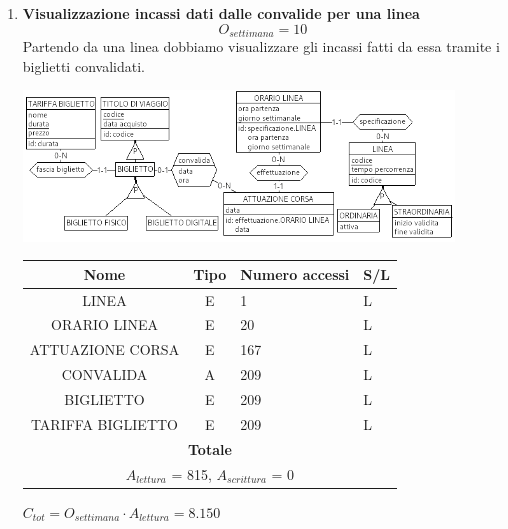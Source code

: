 \documentclass[12pt,a4paper]{report}
\begin{document}
\begin{enumerate}[label=\textbf{\arabic*)}]
	\item \textbf{Visualizzazione incassi dati dalle convalide per una linea} \label{op9} \\
    \[ {O_{settimana} = 10} \]
    Partendo da una linea dobbiamo visualizzare gli incassi fatti da essa tramite i biglietti convalidati.
    \begin{center}
	\includegraphics[width=0.9\textwidth]{op_9}
	\end{center}
    \begin{table}[H]
    \centering
    \begin{tabular}{|c|c|l|l|}
    \hline
    \textbf{Nome} & \textbf{Tipo} & \textbf{Numero accessi} & \textbf{S/L} \\
    \hline
    LINEA & E & 1 & L \\
    \hline
    ORARIO LINEA & E & 20 & L \\
    \hline
    ATTUAZIONE CORSA & E & 167 & L \\
    \hline
    CONVALIDA & A & 209 & L \\
    \hline
    BIGLIETTO & E & 209 & L \\
    \hline
    TARIFFA BIGLIETTO & E & 209 & L \\
    \hline
    \multicolumn{4}{c}{\textbf{Totale}} \\
    \multicolumn{4}{c}{${A_{lettura}}$ = 815, ${A_{scrittura}}$ = 0} \\
    \hline
    \end{tabular}
    \end{table}
    \begin{center}
    ${C_{tot} = {O_{settimana}}\cdot {A_{lettura}} = 8.150}$
    \end{center}




\end{enumerate}
\end{document}
